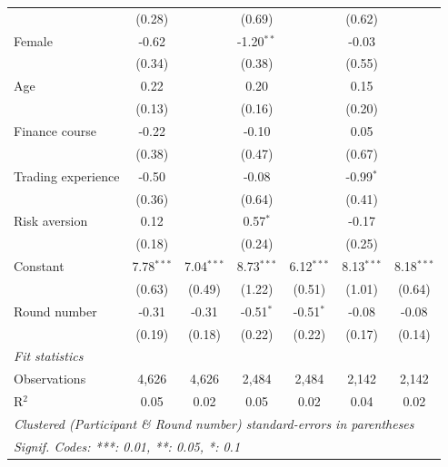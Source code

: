 \begin{tabular}{lcccccc}
                      & (0.28)        &               & (0.69)        &               & (0.62)        &   \\   
   Female             & -0.62         &               & -1.20$^{**}$  &               & -0.03         &   \\   
                      & (0.34)        &               & (0.38)        &               & (0.55)        &   \\   
   Age                & 0.22          &               & 0.20          &               & 0.15          &   \\   
                      & (0.13)        &               & (0.16)        &               & (0.20)        &   \\   
   Finance course     & -0.22         &               & -0.10         &               & 0.05          &   \\   
                      & (0.38)        &               & (0.47)        &               & (0.67)        &   \\   
   Trading experience & -0.50         &               & -0.08         &               & -0.99$^{*}$   &   \\   
                      & (0.36)        &               & (0.64)        &               & (0.41)        &   \\   
   Risk aversion      & 0.12          &               & 0.57$^{*}$    &               & -0.17         &   \\   
                      & (0.18)        &               & (0.24)        &               & (0.25)        &   \\   
   Constant           & 7.78$^{***}$  & 7.04$^{***}$  & 8.73$^{***}$  & 6.12$^{***}$  & 8.13$^{***}$  & 8.18$^{***}$\\   
                      & (0.63)        & (0.49)        & (1.22)        & (0.51)        & (1.01)        & (0.64)\\   
   Round number       & -0.31         & -0.31         & -0.51$^{*}$   & -0.51$^{*}$   & -0.08         & -0.08\\   
                      & (0.19)        & (0.18)        & (0.22)        & (0.22)        & (0.17)        & (0.14)\\   
   \midrule
   \emph{Fit statistics}\\
   Observations       & 4,626         & 4,626         & 2,484         & 2,484         & 2,142         & 2,142\\  
   R$^2$              & 0.05          & 0.02          & 0.05          & 0.02          & 0.04          & 0.02\\  
   \midrule \midrule
   \multicolumn{7}{l}{\emph{Clustered (Participant \& Round number) standard-errors in parentheses}}\\
   \multicolumn{7}{l}{\emph{Signif. Codes: ***: 0.01, **: 0.05, *: 0.1}}\\
\end{tabular}
\par\endgroup
